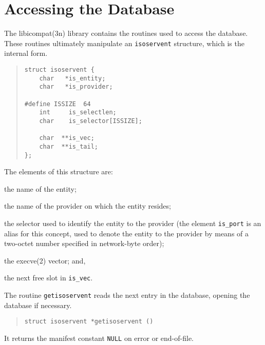 \section	{Accessing the Database}\label{isoservent}
The \man libicompat(3n) library contains the routines used to access the
database.
These routines ultimately manipulate an \verb"isoservent" structure,
which is the internal form.
\begin{quote}\small\begin{verbatim}
struct isoservent {
    char   *is_entity;
    char   *is_provider;

#define ISSIZE  64
    int     is_selectlen;
    char    is_selector[ISSIZE];

    char  **is_vec;
    char  **is_tail;
};
\end{verbatim}\end{quote}
The elements of this structure are:
\begin{describe}
\item[\verb"is\_entity":] the name of the entity;

\item[\verb"is\_provider":] the name of the provider on which the entity
resides;

\item[\verb"is\_selector"\verb"is\_selectlen":] the selector used to
identify the entity to the provider
(the element \verb"is_port" is an alias for this concept,
used to denote the entity to the provider by means of a two-octet number
specified in network-byte order);

\item[\verb"is\_vec":] the \man execve(2) vector;
and,

\item[\verb"is\_tail":] the next free slot in \verb"is_vec".
\end{describe}

The routine \verb"getisoservent" reads the next entry in the database,
opening the database if necessary.
\begin{quote}\small\begin{verbatim}
struct isoservent *getisoservent ()
\end{verbatim}\end{quote}
It returns the manifest constant \verb"NULL" on error or end-of-file.

